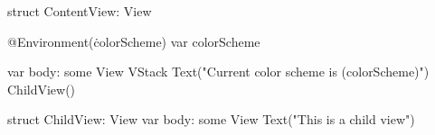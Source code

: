 \begin{swift}[caption=Example of Observable, label=Observable_example]
struct ContentView: View {
    @Environment(\.colorScheme) var colorScheme
    
    var body: some View {
        VStack {
            Text("Current color scheme is (colorScheme)")
            ChildView()
        }
    }
}

struct ChildView: View {
    var body: some View {
        Text("This is a child view")
    }
}
\end{swift}

